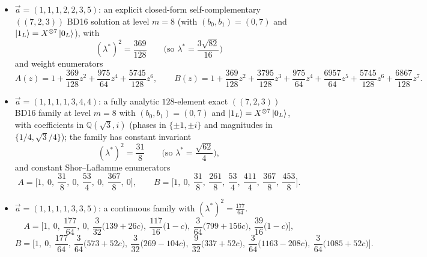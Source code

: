 \documentclass[11pt]{article}
\begin{document}
\begin{itemize}
\((\lambda^\ast)^2\in\left\{1,\ \tfrac{5}{4},\ \tfrac{11}{8}\right\}\)
(equivalently \(\lambda^\ast\in\left\{1,\ \tfrac{\sqrt5}{2},\ \tfrac{\sqrt{22}}{4}\right\}\)),
and Shor--Laflamme enumerator coefficient lists
\[
A^{(A)}=\Big[1,0,1,\tfrac14,15,\tfrac{21}{2},33,\tfrac{13}{4}\Big],\quad
B^{(A)}=\Big[1,0,1,21,32,99,58,44\Big],
\]
\[
A^{(B)}=\Big[1,0,\tfrac54,\tfrac14,\tfrac{29}{2},\tfrac{21}{2},\tfrac{133}{4},\tfrac{13}{4}\Big],\quad
B^{(B)}=\Big[1,0,\tfrac54,\tfrac{87}{4},\tfrac{63}{2},\tfrac{195}{2},\tfrac{233}{4},\tfrac{179}{4}\Big],
\]
\[
A^{(C)}=\Big[1,0,\tfrac{11}{8},\tfrac14,\tfrac{57}{4},\tfrac{21}{2},\tfrac{267}{8},\tfrac{13}{4}\Big],\quad
B^{(C)}=\Big[1,0,\tfrac{11}{8},\tfrac{177}{8},\tfrac{125}{4},\tfrac{387}{4},\tfrac{467}{8},\tfrac{361}{8}\Big].
\]
\item \(\vec a=(1,1,1,2,2,3,5)\): an explicit closed-form self-complementary \(((7,2,3))\) BD16 solution at level \(m=8\) (with \((b_0,b_1)=(0,7)\) and \(\ket{1_L}=X^{\otimes 7}\ket{0_L}\)), with
\[
(\lambda^\ast)^2=\frac{369}{128}\qquad\text{(so }\lambda^\ast=\frac{3\sqrt{82}}{16}\text{)}
\]
and weight enumerators
\[
A(z)=1+\frac{369}{128}z^2+\frac{975}{64}z^4+\frac{5745}{128}z^6,\qquad
B(z)=1+\frac{369}{128}z^2+\frac{3795}{128}z^3+\frac{975}{64}z^4+\frac{6957}{64}z^5+\frac{5745}{128}z^6+\frac{6867}{128}z^7.
\]
\item \(\vec a=(1,1,1,1,3,4,4)\): a fully analytic \(128\)-element exact \(((7,2,3))\) BD16 family at level \(m=8\) with \((b_0,b_1)=(0,7)\) and \(\ket{1_L}=X^{\otimes 7}\ket{0_L}\), with coefficients in \(\mathbb{Q}(\sqrt3,i)\) (phases in \(\{\pm1,\pm i\}\) and magnitudes in \(\{1/4,\sqrt3/4\}\)); the family has constant invariant
\[
(\lambda^\ast)^2=\frac{31}{8}\qquad\text{(so }\lambda^\ast=\frac{\sqrt{62}}{4}\text{)},
\]
and constant Shor--Laflamme enumerators
\[
A=\Big[1,\ 0,\ \frac{31}{8},\ 0,\ \frac{53}{4},\ 0,\ \frac{367}{8},\ 0\Big],\qquad
B=\Big[1,\ 0,\ \frac{31}{8},\ \frac{261}{8},\ \frac{53}{4},\ \frac{411}{4},\ \frac{367}{8},\ \frac{453}{8}\Big].
\]
\item \(\vec a=(1,1,1,1,3,3,5)\): a continuous family with $(\lambda^\ast)^2=\frac{177}{64}$.
\[
A=\Big[
1,\ 0,\ \frac{177}{64},\ 0,\ \frac{3}{32}\bigl(139+26c\bigr),\ \frac{117}{16}\bigl(1-c\bigr),\ 
\frac{3}{64}\bigl(799+156c\bigr),\ \frac{39}{16}\bigl(1-c\bigr)
\Big],
\]
\[
B=\Big[
1,\ 0,\ \frac{177}{64},\ \frac{3}{64}\bigl(573+52c\bigr),\ \frac{3}{32}\bigl(269-104c\bigr),\ 
\frac{9}{32}\bigl(337+52c\bigr),\ \frac{3}{64}\bigl(1163-208c\bigr),\ \frac{3}{64}\bigl(1085+52c\bigr)
\Big].
\]
\end{itemize}
\end{document}
